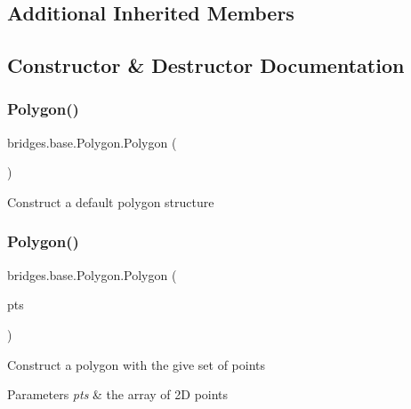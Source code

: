 \subsection*{Additional Inherited Members}


\subsection{Constructor \& Destructor Documentation}
\mbox{\label{classbridges_1_1base_1_1_polygon_af0c1b3bc3147ffbda98fd9c515a8052d}} 
\subsubsection{\texorpdfstring{Polygon()}{Polygon()}\hspace{0.1cm}{\footnotesize\ttfamily [1/2]}}
{\footnotesize\ttfamily bridges.\+base.\+Polygon.\+Polygon (\begin{DoxyParamCaption}{ }\end{DoxyParamCaption})}

Construct a default polygon structure \mbox{\label{classbridges_1_1base_1_1_polygon_a341cc297ba7f0f201d31aa3c98ecf108}} 
\subsubsection{\texorpdfstring{Polygon()}{Polygon()}\hspace{0.1cm}{\footnotesize\ttfamily [2/2]}}
{\footnotesize\ttfamily bridges.\+base.\+Polygon.\+Polygon (\begin{DoxyParamCaption}\item[{Array\+List$<$ Float $>$}]{pts }\end{DoxyParamCaption})}

Construct a polygon with the give set of points 
\begin{DoxyParams}{Parameters}
{\em pts} & the array of 2D points \\
\hline
\end{DoxyParams}


